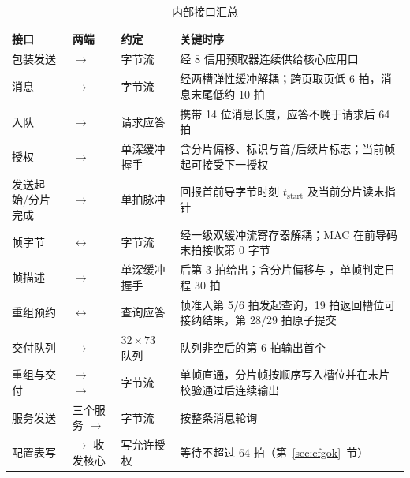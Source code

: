 \begin{table}\centering\small
\caption{内部接口汇总}\label{tab:ifsum}
\begin{tabularx}{\linewidth}{>{\raggedright\arraybackslash}p{2.6cm}>{\raggedright\arraybackslash}p{3.5cm}>{\raggedright\arraybackslash}p{1.6cm}L}
\toprule
接口 & 两端 & 约定 & 关键时序 \\
\midrule
包装发送  &  $\rightarrow$  & 字节流 & 经 8 信用预取器连续供给核心应用口 \\
消息  &  $\rightarrow$  & 字节流 & 经两槽弹性缓冲解耦；跨页取页低 6 拍，消息末尾低约 10 拍 \\
入队  &  $\rightarrow$  & 请求应答 & 携带 14 位消息长度，应答不晚于请求后 64 拍 \\
授权  &  $\rightarrow$  & 单深缓冲握手 & 含分片偏移、标识与首/后续片标志；当前帧  起可接受下一授权 \\
发送起始/分片完成 &  $\rightarrow$  & 单拍脉冲 & 回报首前导字节时刻 $t_\text{start}$ 及当前分片读末指针  \\
帧字节  &  $\leftrightarrow$  & 字节流 & 经一级双缓冲流寄存器解耦；MAC 在前导码末拍接收第 0 字节 \\
帧描述  &  $\rightarrow$  & 单深缓冲握手 &  后第 3 拍给出；含分片偏移与 ，单帧判定日程 30 拍 \\
重组预约  &  $\leftrightarrow$  & 查询应答 & 帧准入第 5/6 拍发起查询，19 拍返回槽位可接纳结果，第 28/29 拍原子提交 \\
交付队列  &  $\rightarrow$  & $32\times 73$ 队列 & 队列非空后的第 6 拍输出首个  \\
重组与交付  &  $\rightarrow$  $\rightarrow$  & 字节流 & 单帧直通，分片帧按顺序写入槽位并在末片校验通过后连续输出 \\
服务发送  & 三个服务 $\rightarrow$  & 字节流 & 按整条消息轮询 \\
配置表写 &  $\rightarrow$ 收发核心 & 写允许授权 & 等待不超过 64 拍（第~\ref{sec:cfgok}~节） \\
\bottomrule
\end{tabularx}
\end{table}
